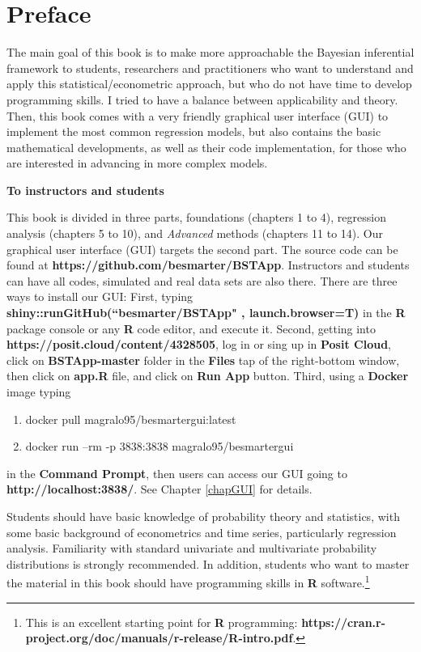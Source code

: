 \chapter*{Preface}
The main goal of this book is to make more approachable the Bayesian inferential framework to students, researchers and practitioners who want to understand and apply this statistical/econometric approach, but who do not have time to develop programming skills. I tried to have a balance between applicability and theory. Then, this book comes with a very friendly graphical user interface (GUI) to implement the most common regression models, but also contains the basic mathematical developments, as well as their code implementation, for those who are interested in advancing in more complex models.

\textbf{To instructors and students}

This book is divided in three parts, foundations (chapters 1 to 4), regression analysis (chapters 5 to 10), and \textit{Advanced} methods (chapters 11 to 14). Our graphical user interface (GUI) targets the second part. The source code can be found at \textbf{https://github.com/besmarter/BSTApp}. Instructors and students can have all codes, simulated and real data sets are also there. There are three ways to install our GUI: First, typing \textbf{shiny::runGitHub(``besmarter/BSTApp" , launch.browser=T)} in the \textbf{R} package console or any \textbf{R} code editor, and execute it. Second, getting into \textbf{https://posit.cloud/content/4328505}, log in or sing up in \textbf{Posit Cloud}, click on \textbf{BSTApp-master} folder in the \textbf{Files} tap of the right-bottom window, then click on \textbf{app.R} file, and click on \textbf{Run App} button. Third, using a \textbf{Docker} image typing
\begin{enumerate}
	\item docker pull magralo95/besmartergui:latest
	\item docker run --rm -p 3838:3838 magralo95/besmartergui
\end{enumerate}
in the \textbf{Command Prompt}, then users can access our GUI going to \textbf{http://localhost:3838/}. See Chapter \ref{chapGUI} for details.

Students should have basic knowledge of probability theory and statistics, with some basic background of econometrics and time series, particularly regression analysis. Familiarity with standard univariate and multivariate probability distributions is strongly recommended. In addition, students who want to master the material in this book should have programming skills in \textbf{R} software.\footnote{This is an excellent starting point for \textbf{R} programming: \textbf{https://cran.r-project.org/doc/manuals/r-release/R-intro.pdf}.} 

